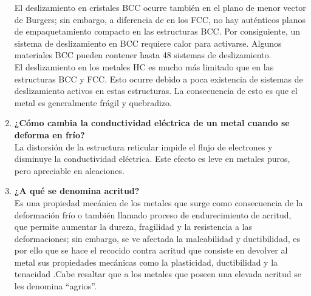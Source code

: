 \documentclass[a4paper,12pt]{report}
\begin{document}
\begin{enumerate}
El deslizamiento en cristales BCC ocurre también en el plano de menor vector de Burgers; sin embargo, a diferencia de en los FCC, no hay auténticos planos de empaquetamiento compacto en las estructuras BCC. Por consiguiente, un sistema de deslizamiento en BCC requiere calor para activarse. Algunos materiales BCC pueden contener hasta 48 sistemas de deslizamiento.\\
El deslizamiento en los metales HC es mucho más limitado que en las estructuras BCC y FCC. Esto ocurre debido a poca existencia de sistemas de deslizamiento activos en estas estructuras. La consecuencia de esto es que el metal es generalmente frágil y quebradizo.
\item \textbf{¿Cómo cambia la conductividad eléctrica de un metal cuando se deforma en frío?}\\
La distorsión de la estructura reticular impide el flujo de electrones y disminuye la conductividad eléctrica. Este efecto es leve en metales puros, pero apreciable en aleaciones.
\item \textbf{¿A qué se denomina acritud?}\\
Es una propiedad mecánica de los metales que surge como consecuencia de la deformación frío o también llamado proceso de endurecimiento de acritud, que permite aumentar la dureza, fragilidad y la resistencia a las deformaciones; sin embargo, se ve afectada la maleabilidad y ductibilidad, es por ello que se hace el recocido contra acritud que consiste en devolver al metal sus propiedades mecánicas como la plasticidad, ductibilidad y la tenacidad .Cabe resaltar que a los metales que poseen una elevada acritud se les denomina “agrios”.
\end{enumerate}
\end{document}
